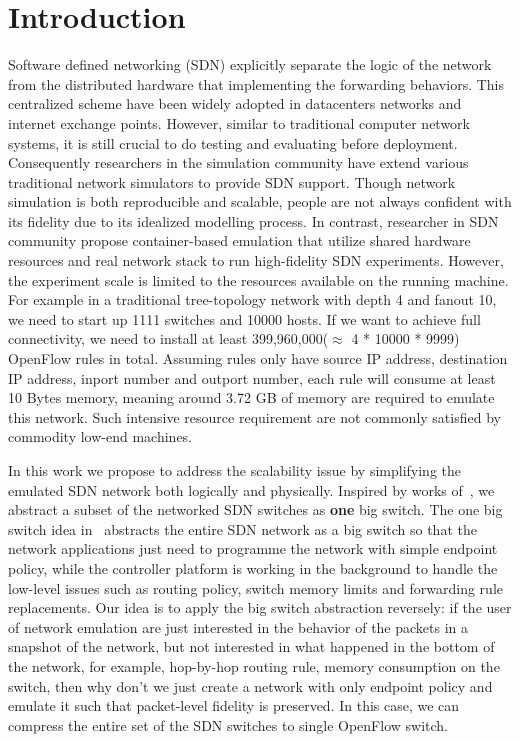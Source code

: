 \section{Introduction}

Software defined networking (SDN) explicitly separate the logic of the network
from the distributed hardware that implementing the forwarding behaviors.
This centralized scheme have been widely adopted in datacenters networks
and internet exchange points\cite{B4, Meridian, SDX}.
However, similar to traditional computer network systems, it is still crucial to do testing
and evaluating before deployment.
Consequently researchers in the simulation community have extend various
traditional network simulators to provide SDN support\cite{S3F, NS3, OPNET}.
Though network simulation is both reproducible and scalable,
people are not always confident with its fidelity due to its idealized modelling process.
In contrast, researcher in SDN community propose container-based emulation that utilize
shared hardware resources and real network stack to run high-fidelity SDN experiments\cite{Mininet}.
However, the experiment scale is limited to the resources available on the running machine.
For example in a traditional tree-topology network with depth 4 and fanout 10,
we need to start up 1111 switches and 10000 hosts.
If we want to achieve full connectivity, we need to install at least 399,960,000($\approx$ 4 * 10000 * 9999)
OpenFlow rules in total.
Assuming rules only have source IP address, destination IP address, inport number and outport number,
each rule will consume at least 10 Bytes memory, meaning around 3.72 GB of memory are required to
emulate this network.
Such intensive resource requirement are not commonly satisfied by commodity low-end machines.

In this work we propose to address the scalability issue by simplifying the emulated
SDN network both logically and physically.
Inspired by works of~\cite{OneBigSwitchAbstraction},
we abstract a subset of the networked SDN switches as \textbf{one} big switch.
The one big switch idea in~\cite{OneBigSwitchAbstraction} abstracts the entire SDN network as
a big switch so that the network applications just need to programme the network with simple
endpoint policy, while the controller platform is working in the background to handle
the low-level issues such as routing policy, switch memory limits and forwarding rule replacements.
Our idea is to apply the big switch abstraction reversely:
if the user of network emulation are just interested in the behavior of the packets in
a snapshot of the network, but not interested in what happened in the bottom of the network,
for example, hop-by-hop routing rule, memory consumption on the switch, then why don't we
just create a network with only endpoint policy and emulate it such that packet-level
fidelity is preserved.
In this case, we can compress the entire set of the SDN switches to single OpenFlow switch.


